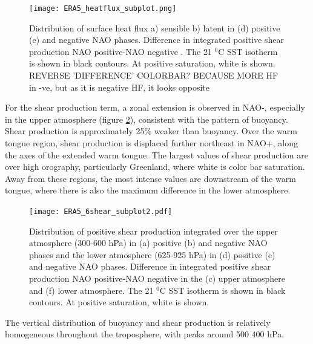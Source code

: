 \begin{figure}[h]
	\centering
	\texttt{[image: ERA5\_heatflux\_subplot.png]}
	\caption{Distribution of surface heat flux a) sensible b) latent in (d) positive (e) and negative NAO phases. Difference in integrated positive shear production NAO positive-NAO negative . The 21 $^{0}$C SST isotherm is shown in black contours. At positive saturation, white is shown. REVERSE 'DIFFERENCE' COLORBAR? BECAUSE MORE HF in -ve, but as it is negative HF, it looks opposite}
	\label{fig:ERA5_hf}
\end{figure}


For the shear production term, a zonal extension is observed in NAO-, especially in the upper atmosphere (figure \ref{fig:ERA5_shear}), consistent with the pattern of buoyancy. Shear production is approximately 25\% weaker than buoyancy. Over the warm tongue region, shear production is displaced further northeast in NAO+, along the axes of the extended warm tongue. The largest values of shear production are over high orography, particularly Greenland, where white is color bar saturation. Away from these regions, the most intense values are downstream of the warm tongue, where there is also the maximum difference in the lower atmosphere.



\begin{figure}[h]
	\centering
	\texttt{[image: ERA5\_6shear\_subplot2.pdf]}
	\caption{Distribution of positive shear production integrated over the upper atmosphere (300-600 hPa) in (a) positive (b) and negative NAO phases and the lower atmosphere (625-925 hPa) in (d) positive (e) and negative NAO phases. Difference in integrated positive shear production NAO positive-NAO negative in the (c) upper atmosphere and (f) lower atmosphere. The 21 $^{0}$C SST isotherm is shown in black contours. At positive saturation, white is shown.}
	\label{fig:ERA5_shear}
\end{figure}

The vertical distribution of buoyancy and shear production is relatively homogeneous throughout the troposphere, with peaks around 500 400 hPa.

